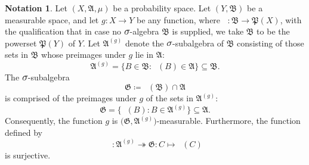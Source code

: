\documentclass[
twoside=true,
paper=letter,
fontsize=9pt,
pagesize=auto,
leqno,
openany,
headsepline,
overfullrule,
]{scrbook}
\theoremstyle{plain}
\theoremstyle{plain}
\theoremstyle{definition}
\newtheorem{notn}[thm]{Notation}
\theoremstyle{bfnoteitalic}
\theoremstyle{bfnoteroman}
\newcommand{\sigalg}[1]{\mathfrak{#1}}
\newcommand{\definedby}{\coloneqq}
\newcommand{\textsigma}{\hbox{\large{$\sigma$}}\kern-1pt}
\newcommand{\preimage}[1]{\mathop{#1^{\leftarrow}}}
\newcommand{\meets}{\cap}
\newcommand{\sigmaalgebra}{\sigalg{A}}
\newcommand{\sigmaalgebraii}{\sigalg{B}}
\newcommand{\powerset}{\mathfrak{P}}
\newcommand{\functionii}{g}
\newcommand{\measurespace}{X}
\newcommand{\measurespaceii}{Y}
\newcommand{\measure}{\mu}
\begin{document}
\begin{notn}
Let $(\measurespace, \sigmaalgebra,\measure)$ be a probability space.
Let $(\measurespaceii, \sigmaalgebraii)$ be a measurable space, and let $\functionii:\measurespace\to\measurespaceii$ be any function, where $\preimage{\functionii}:\sigmaalgebraii\to\powerset(\measurespace)$,
with the qualification that in case no $\textsigma$-algebra $\sigmaalgebraii$ is supplied, we take $\sigmaalgebraii$ to be the powerset $\powerset(\measurespaceii)$ of $\measurespaceii$. 
Let $\sigmaalgebra^{(\functionii)}$ denote the $\textsigma$-subalgebra of $\sigmaalgebraii$ consisting of those sets in $\sigmaalgebraii$ whose preimages under $\functionii$ lie in $\sigmaalgebra$:
\[
\sigmaalgebra^{(\functionii)}
=
\{ B\in \sigmaalgebraii : \preimage{\functionii}(B)\in \sigmaalgebra \} 
\subseteq \sigmaalgebraii.
\]
The $\textsigma$-subalgebra
\[
\sigalg{G}\definedby
\preimage{\functionii}(\sigmaalgebraii)\meets\sigmaalgebra
\]
is comprised of the preimages under $\functionii$ of the sets in $\sigmaalgebra^{(\functionii)}$:
\[
\sigalg{G}
=
\bigl\{ \preimage{\functionii}(B) : B \in \sigmaalgebra^{(\functionii)} \bigr\} 
\subseteq \sigmaalgebra.
\]
Consequently, the function $\functionii$ is
$\bigl(\sigalg{G}, \sigmaalgebra^{(\functionii)}\bigr)$\hyp{}measurable. Furthermore, the function defined by
\[
\preimage{\functionii}:\sigmaalgebra^{(\functionii)} 
\twoheadrightarrow
\sigalg{G}:
C \mapsto \preimage{\functionii}(C)
\]
is surjective.
\end{notn}
\end{document}
